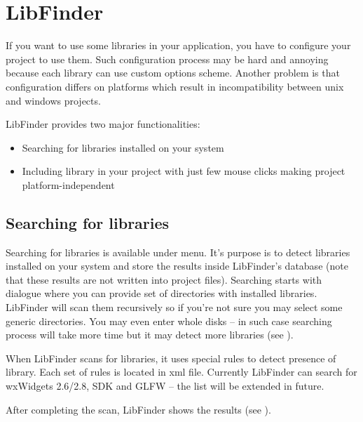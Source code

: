 \section{LibFinder}\label{sec:lib_finder}

If you want to use some libraries in your application, you have to configure your project to use them. Such configuration process may be hard and annoying because each library can use custom options scheme. Another problem is that configuration differs on platforms which result in incompatibility between unix and windows projects.

LibFinder provides two major functionalities:

\begin{itemize}
\item Searching for libraries installed on your system
\item Including library in your project with just few mouse clicks making project platform-independent
\end{itemize}

\subsection{Searching for libraries}

Searching for libraries is available under  menu. It's purpose is to detect libraries installed on your system and store the results inside LibFinder's database (note that these results are not written into \codeblocks project files). Searching starts with dialogue where you can provide set of directories with installed libraries. LibFinder will scan them recursively so if you're not sure you may select some generic directories. You may even enter whole disks -- in such case searching process will take more time but it may detect more libraries (see ).


When LibFinder scans for libraries, it uses special rules to detect presence of library. Each set of rules is located in xml file. Currently LibFinder can search for wxWidgets 2.6/2.8, \codeblocks SDK and GLFW -- the list will be extended in future.


After completing the scan, LibFinder shows the results (see ).

